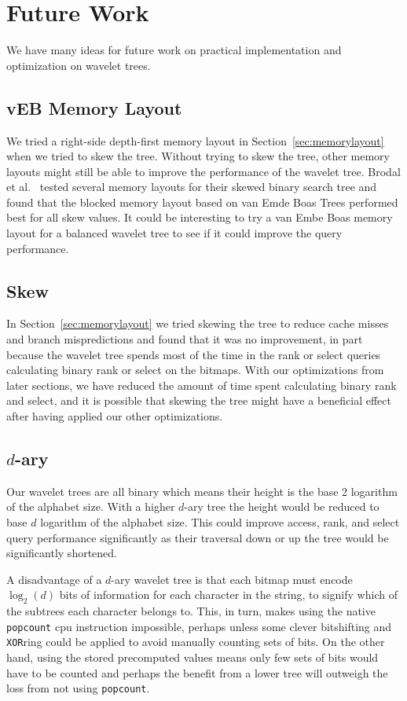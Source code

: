 \section{Future Work}
We have many ideas for future work on practical implementation and optimization on wavelet trees.

\subsection{vEB Memory Layout}
\label{sec:futurework_vebmemorylayout}
We tried a right-side depth-first memory layout in Section~\ref{sec:memorylayout} when we tried to skew the tree.
Without trying to skew the tree, other memory layouts might still be able to improve the performance of the wavelet tree.
Brodal et al.~ tested several memory layouts for their skewed binary search tree and found that the blocked memory layout based on van Emde Boas Trees performed best for all skew values.
It could be interesting to try a van Embe Boas memory layout for a balanced wavelet tree to see if it could improve the query performance.

\subsection{Skew}
In Section~\ref{sec:memorylayout} we tried skewing the tree to reduce cache misses and branch mispredictions and found that it was no improvement, in part because the wavelet tree spends most of the time in the rank or select queries calculating binary rank or select on the bitmaps.
With our optimizations from later sections, we have reduced the amount of time spent calculating binary rank and select, and it is possible that skewing the tree might have a beneficial effect after having applied our other optimizations.

\subsection{$d$-ary}
Our wavelet trees are all binary which means their height is the base 2 logarithm of the alphabet size.
With a higher $d$-ary tree the height would be reduced to base $d$ logarithm of the alphabet size.
This could improve access, rank, and select query performance significantly as their traversal down or up the tree would be significantly shortened.

A disadvantage of a $d$-ary wavelet tree is that each bitmap must encode $\log_2(d)$ bits of information for each character in the string, to signify which of the subtrees each character belongs to.
This, in turn, makes using the native \texttt{popcount} cpu instruction impossible, perhaps unless some clever bitshifting and \texttt{XOR}ring could be applied to avoid manually counting sets of bits.
On the other hand, using the stored precomputed values means only few sets of bits would have to be counted and perhaps the benefit from a lower tree will outweigh the loss from not using \texttt{popcount}.

